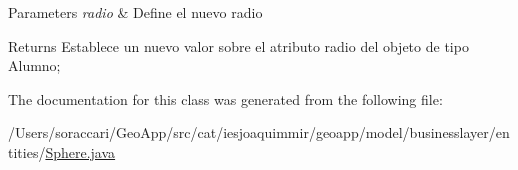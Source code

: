 \begin{DoxyParams}{Parameters}
{\em radio} & Define el nuevo radio \\
\hline
\end{DoxyParams}
\begin{DoxyReturn}{Returns}
Establece un nuevo valor sobre el atributo radio del objeto de tipo Alumno; 
\end{DoxyReturn}


The documentation for this class was generated from the following file\+:\begin{DoxyCompactItemize}
\item 
/\+Users/soraccari/\+Geo\+App/src/cat/iesjoaquimmir/geoapp/model/businesslayer/entities/\mbox{\hyperlink{_sphere_8java}{Sphere.\+java}}\end{DoxyCompactItemize}
